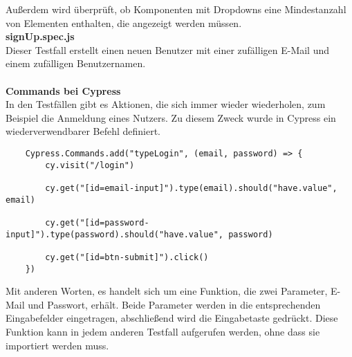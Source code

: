 Außerdem wird überprüft, ob Komponenten mit Dropdowns eine Mindestanzahl von Elementen enthalten, die angezeigt werden müssen. 
\\
\textbf{signUp.spec.js}\\
Dieser Testfall erstellt einen neuen Benutzer mit einer zufälligen E-Mail und einem zufälligen Benutzernamen.  \\
\\
\textbf{Commands bei Cypress}\\
In den Testfällen gibt es Aktionen, die sich immer wieder wiederholen, zum Beispiel die Anmeldung eines Nutzers.
Zu diesem Zweck wurde in Cypress ein wiederverwendbarer Befehl definiert.
\begin{lstlisting}
    Cypress.Commands.add("typeLogin", (email, password) => {
        cy.visit("/login")
    
        cy.get("[id=email-input]").type(email).should("have.value", email)
    
        cy.get("[id=password-input]").type(password).should("have.value", password)
    
        cy.get("[id=btn-submit]").click()
    })
\end{lstlisting}
Mit anderen Worten, es handelt sich um eine Funktion, die zwei Parameter, E-Mail und Passwort, erhält. 
Beide Parameter werden in die entsprechenden Eingabefelder eingetragen, abschließend wird die Eingabetaste gedrückt.
Diese Funktion kann in jedem anderen Testfall aufgerufen werden, ohne dass sie importiert werden muss.
